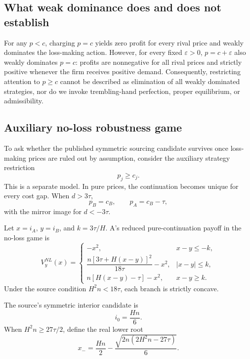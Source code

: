 \subsection{What weak dominance does and does not establish}

For any \(p<c\), charging \(p=c\) yields zero profit for every rival price and weakly dominates the loss-making action.  However, for every fixed \(\varepsilon>0\), \(p=c+\varepsilon\) also weakly dominates \(p=c\): profits are nonnegative for all rival prices and strictly positive whenever the firm receives positive demand.  Consequently, restricting attention to \(p\ge c\) cannot be described as elimination of all weakly dominated strategies, nor do we invoke trembling-hand perfection, proper equilibrium, or admissibility.

\subsection{Auxiliary no-loss robustness game}

To ask whether the published symmetric sourcing candidate survives once loss-making prices are ruled out by assumption, consider the auxiliary strategy restriction
\begin{equation}
p_j\ge c_j.
\label{eq:no-loss}
\end{equation}
This is a separate model.  In pure prices, the continuation becomes unique for every cost gap.  When \(d>3\tau\),
\[
p_B=c_B,\qquad p_A=c_B-\tau,
\]
with the mirror image for \(d<-3\tau\).

Let \(x=i_A\), \(y=i_B\), and \(k=3\tau/H\).  A's reduced pure-continuation payoff in the no-loss game is
\begin{equation}
V_y^{NL}(x)=
\begin{cases}
-x^2,
&x-y\le-k,\\[4pt]
\dfrac{n[3\tau+H(x-y)]^2}{18\tau}-x^2,
&|x-y|\le k,\\[9pt]
n[H(x-y)-\tau]-x^2,
&x-y\ge k.
\end{cases}
\label{eq:no-loss-payoff}
\end{equation}
Under the source condition \(H^2n<18\tau\), each branch is strictly concave.

The source's symmetric interior candidate is
\begin{equation}
i_0=\frac{Hn}{6}.
\label{eq:i0}
\end{equation}
When \(H^2n\ge 27\tau/2\), define the real lower root
\begin{equation}
x_-=
\frac{Hn}{2}
-
\frac{\sqrt{2n(2H^2n-27\tau)}}{6}.
\label{eq:xminus}
\end{equation}

